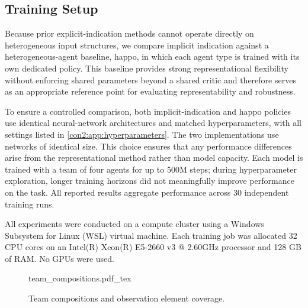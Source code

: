 \documentclass[]{jair}
\begin{document}
\subsection{Training Setup}

Because prior explicit-indication methods cannot operate directly on
heterogeneous input structures, we compare implicit indication against a 
heterogeneous-agent baseline, \gls{happo}, in which each agent type is trained
with its own dedicated policy. This baseline provides strong representational
flexibility without enforcing shared parameters beyond a shared critic and
therefore serves as an appropriate reference point for evaluating
representability and robustness.

To ensure a controlled comparison, both implicit-indication and \gls{happo}
policies use identical neural-network architectures and matched hyperparameters, 
with all settings listed in \cref{con2:app:hyperparameters}. 
The two implementations use networks of identical size.
This choice ensures that any performance differences arise from 
the representational method rather than model capacity.
Each model is trained with a team of four agents for up to 500M steps; 
during hyperparameter exploration, 
longer training horizons did not meaningfully improve performance on the task.
All reported results aggregate performance across 30 independent training runs.  

All experiments were conducted on a compute cluster using a Windows Subsystem 
for Linux (WSL) virtual machine. Each training job was allocated 32 CPU cores on an 
Intel(R) Xeon(R) E5-2660 v3 @ 2.60GHz processor and 128 GB of RAM. No GPUs were used.

\begin{figure}
    \begin{center}
        {team_compositions.pdf_tex}
    \end{center}
    \caption{Team compositions and observation element coverage.}
    \label{con2:fig:team_compositions}
\end{figure}
\end{document}
